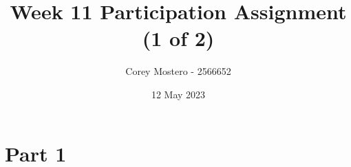 \documentclass{article}
\title{Week 11 Participation Assignment (1 of 2)}
\author{Corey Mostero - 2566652}
\date{12 May 2023}
\begin{document}
\newcommand{\hr}{\par\noindent\rule{\textwidth}{0.4pt}}

\newcommand{\bc}[1]{
	\begin{equation*}
		\begin{boxed}
			{#1}
		\end{boxed}
	\end{equation*}
}

\newcommand{\cond}[2]{
	\ifmmode
		{#1} \quad {#2}
	\else
		$$ {#1} \quad {#2} $$
	\fi
}

\newcommand{\matr}[1]{
	\ifmmode \bm{#1}
	\else \textit{\textbf{#1}}
	\fi
}
\newcommand{\vect}[1]{
	\ifmmode \mathbf{#1}
	\else \textbf{#1}
	\fi
}

\maketitle
\newpage

\tableofcontents

\section{Part 1}
\end{document}
